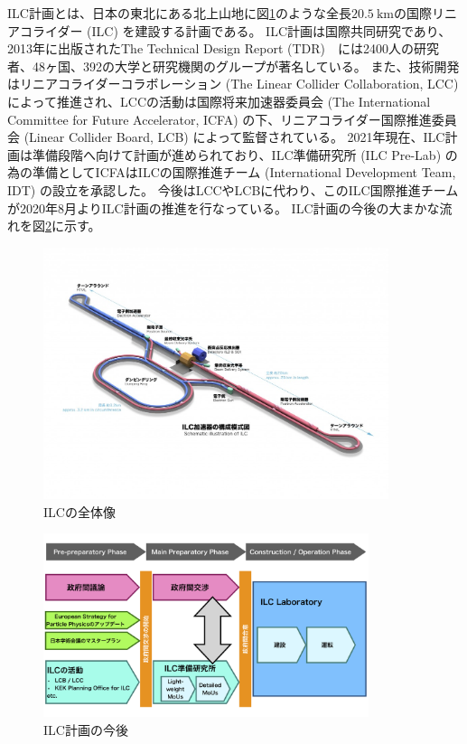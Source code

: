 ILC計画とは、日本の東北にある北上山地に図\ref{2InternationalLinearCollider}のような全長$20.5\ \mathrm{km}$の国際リニアコライダー (ILC) を建設する計画である。
ILC計画は国際共同研究であり、2013年に出版されたThe Technical Design Report (TDR\cite{ILCTDRVES})　には2400人の研究者、48ヶ国、392の大学と研究機関のグループが著名している。
また、技術開発はリニアコライダーコラボレーション (The Linear Collider Collaboration, LCC) によって推進され、LCCの活動は国際将来加速器委員会 (The International Committee for Future Accelerator, ICFA) の下、リニアコライダー国際推進委員会 (Linear Collider Board, LCB) によって監督されている。
2021年現在、ILC計画は準備段階へ向けて計画が進められており、ILC準備研究所 (ILC Pre-Lab) の為の準備としてICFAはILCの国際推進チーム (International Development Team, IDT) の設立を承認した。
今後はLCCやLCBに代わり、このILC国際推進チームが2020年8月よりILC計画の推進を行なっている。
ILC計画の今後の大まかな流れを図\ref{3ILCProject}に示す。

\begin{figure}[htbp]
 \centering
  \includegraphics[trim = 0 100 0 100, width=0.9\textwidth, clip]{Figure/1Introduction/2InternationalLinearCollider.jpg}
  \caption[ILCの全体像]
                 {ILCの全体像\cite{ILCPHOTO}}
  \label{2InternationalLinearCollider}
\end{figure}

\begin{figure}[htbp]
 \centering
 \includegraphics[width=0.85\textwidth]{Figure/1Introduction/3ILCProject.png}
 \caption[ILC計画の今後]
                {ILC計画の今後\cite{RecommendationsonILCProjectImplementation}}
 \label{3ILCProject}
\end{figure}


